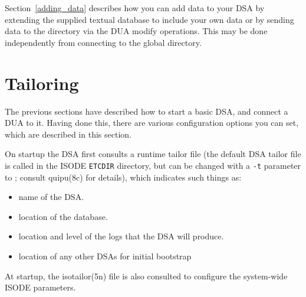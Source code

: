 Section~\ref{adding_data} describes how you can add data to your DSA by
extending the supplied textual database to include your 
own data
or by sending data to the directory via the DUA modify operations.
This may be done independently from connecting to the global directory.

\section {Tailoring}\label{dsa:tailor}

The previous sections have described how to start a basic DSA, and
connect a DUA to it.  Having done this, there are various
configuration options you can set, which are described in this section.

On startup the DSA first consults a runtime tailor file 
(the default DSA tailor file is called  in the ISODE
\verb"ETCDIR" directory, but can be
changed with a \verb"-t" parameter to ;
consult \man quipu(8c) for details),
which indicates such things as:

\begin{itemize}
\item
name of the DSA.
\item
location of the database.
\item
location and level of the logs that the DSA will produce.
\item
location of any other DSAs for initial bootstrap
\end{itemize}

At startup, the \man isotailor(5n) file is also 
consulted to configure the system-wide ISODE parameters.

